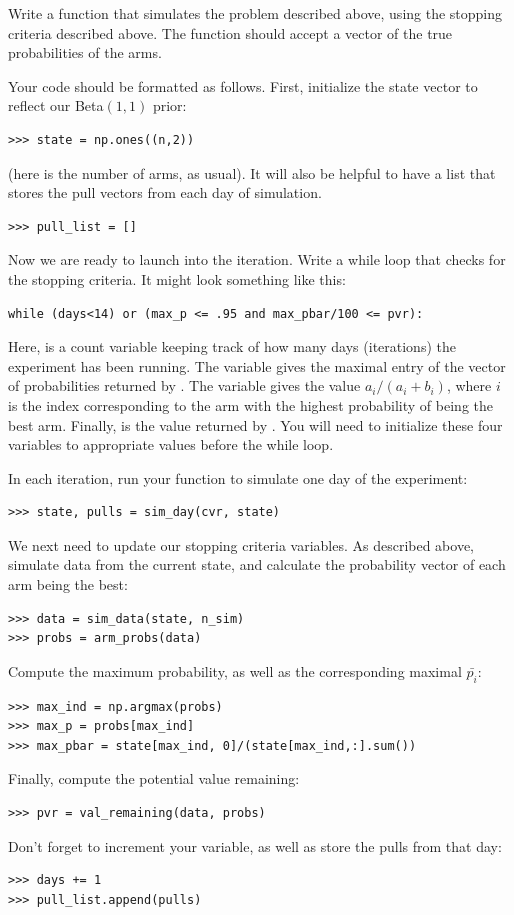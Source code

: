\begin{problem}
Write a function  that simulates the problem described above,
using the stopping criteria described above.
The function should accept a vector of the true probabilities of the arms.

Your code should be formatted as follows.
First, initialize the state vector to reflect our Beta$(1,1)$ prior:
\begin{lstlisting}
>>> state = np.ones((n,2))
\end{lstlisting}
(here  is the number of arms, as usual).
It will also be helpful to have a list  that stores
the pull vectors from each day of simulation.
\begin{lstlisting}
>>> pull_list = []
\end{lstlisting}

Now we are ready to launch into the iteration.
Write a while loop that checks for the stopping criteria.
It might look something like this:
\begin{lstlisting}
while (days<14) or (max_p <= .95 and max_pbar/100 <= pvr):
\end{lstlisting}
Here,  is a count variable keeping track of how many days (iterations) the experiment
has been running. The variable  gives the maximal entry of the vector of
probabilities returned by . The variable  gives the value
$a_i/(a_i+b_i)$, where $i$ is the index corresponding to the arm with the highest
probability of being the best arm. Finally,  is the value returned by
. You will need to initialize these four variables to appropriate
values before the while loop.

In each iteration, run your  function to simulate one day of the experiment:
\begin{lstlisting}
>>> state, pulls = sim_day(cvr, state)
\end{lstlisting}
We next need to update our stopping criteria variables.
As described above, simulate data from the current state, and calculate the
probability vector of each arm being the best:
\begin{lstlisting}
>>> data = sim_data(state, n_sim)
>>> probs = arm_probs(data)
\end{lstlisting}
Compute the maximum probability, as well as the corresponding maximal $\bar{p_i}$:
\begin{lstlisting}
>>> max_ind = np.argmax(probs)
>>> max_p = probs[max_ind]
>>> max_pbar = state[max_ind, 0]/(state[max_ind,:].sum())
\end{lstlisting}
Finally, compute the potential value remaining:
\begin{lstlisting}
>>> pvr = val_remaining(data, probs)
\end{lstlisting}
Don't forget to increment your  variable, as well as store the pulls from
that day:
\begin{lstlisting}
>>> days += 1
>>> pull_list.append(pulls)
\end{lstlisting}


\end{problem}
